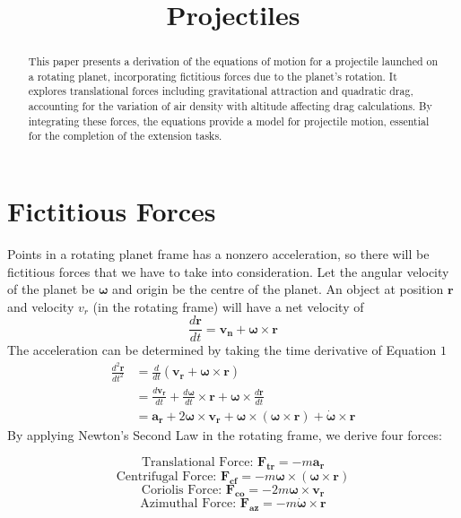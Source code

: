 \documentclass[14]{article}
\title{Projectiles}
\newcommand{\bs}[1]{\boldsymbol{#1}}
\newcommand{\om}{\omega}
\begin{document}
\maketitle
\begin{abstract}
This paper presents a derivation of the equations of motion for a projectile launched on a rotating planet, incorporating fictitious forces due to the planet's rotation. It explores translational forces including gravitational attraction and quadratic drag, accounting for the variation of air density with altitude affecting drag calculations. By integrating these forces, the equations provide a model for projectile motion, essential for the completion of the extension tasks.
\end{abstract}
\section{Fictitious Forces}
Points in a rotating planet frame has a nonzero acceleration, so there will be fictitious forces that we have to take into consideration. Let the angular velocity of the planet be $\bs{\om}$ and origin be the centre of the planet. An object at position $\bs{r}$ and velocity $v_r$ (in the rotating frame) will have a net velocity of 
\begin{equation} \frac{d\bs{r}}{dt} = \bs{v_n} + \bs{\om} \times \bs{r} \end{equation}
The acceleration can be determined by taking the time derivative of Equation $1$
\begin{equation}
\begin{aligned}
\frac{d^2\bs{r}}{dt^2} &= \frac{d}{dt}\left(\bs{v_r} + \bs{\om} \times \bs{r}\right) \\
&= \frac{d\bs{v_r}}{dt} + \frac{d\bs{\om}}{dt} \times \bs{r} + \bs{\om} \times \frac{d\bs{r}}{dt} \\
&= \bs{a_r} + 2\bs{\om} \times \bs{v_r} + \bs{\om} \times (\bs{\om} \times \bs{r}) + \dot{\bs{\om}} \times \bs{r}
\end{aligned}
\end{equation}
By applying Newton's Second Law in the rotating frame, we derive four forces:
\begin{center}
\begin{equation}\text{Translational Force: } \bs{F_{tr}} = -m\bs{a_r}\end{equation}
\begin{equation}\text{Centrifugal Force: } \bs{F_{cf}} = -m\bs{\om} \times (\bs{\om} \times \bs{r})\end{equation}
\begin{equation}\text{Coriolis Force: } \bs{F_{co}} = -2m\bs{\om} \times \bs{v_r}\end{equation}
\begin{equation}\text{Azimuthal Force: } \bs{F_{az}} = -m\dot{\bs{\om}} \times \bs{r}\end{equation}
\end{center}
\end{document}
